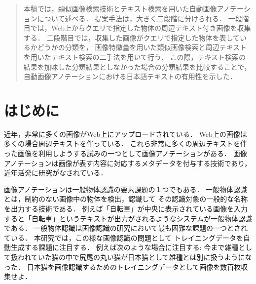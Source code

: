 
\begin{abstract}
本稿では，類似画像検索技術とテキスト検索を用いた自動画像アノテーションについて述べる．
提案手法は，大きく二段階に分けられる．
一段階目では，Web上からクエリで指定した物体の周辺テキスト付き画像を収集する．
二段階目では，収集した画像がクエリで指定した物体を表しているかどうかの分類を，
画像特徴量を用いた類似画像検索と周辺テキストを用いたテキスト検索の二手法を用いて行う．
この際，テキスト検索の結果を加味した分類結果としなかった場合の分類結果を比較することで，
自動画像アノテーションにおける日本語テキストの有用性を示した．
\end{abstract}



\chapter{はじめに}



近年，非常に多くの画像がWeb上にアップロードされている．
Web上の画像は多くの場合周辺テキストを伴っている．
これら非常に多くの周辺テキストを伴った画像を利用しようする試みの一つとして画像アノテーションがある．
画像アノテーションは画像が表す内容に対応するメタデータを付与する技術であり，近年活発に研究がなされている\cite{jeon,watanabe}．

画像アノテーションは一般物体認識の要素課題の１つでもある．
一般物体認識とは，制約のない画像中の物体を検出，認識して
その認識対象の一般的な名称を出力する技術である．
例えば「自転車」が中央に表示されている画像を入力すると「自転車」というテキストが出力がされるようなシステムが一般物体認識である．
一般物体認識は画像認識の研究において最も困難な課題の一つとされている．
%
本研究では，この様な画像認識の問題として
トレイニングデータを自動生成する課題に注目する．
例えば次のような場合に注目する:
今まで雑種として扱われていた猫の中で尻尾の丸い猫が日本猫として雑種とは別に扱うようになった．
日本猫を画像認識するためのトレイニングデータとして画像を数百枚収集せよ．



